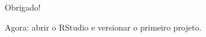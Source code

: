 \documentclass[10pt,aspectratio=169]{beamer}
\begin{document}
\begin{frame}
\centering
\Huge Obrigado!

\vspace{0.5cm}
\Large Agora: abrir o RStudio e versionar o primeiro projeto.
\end{frame}
\end{document}
